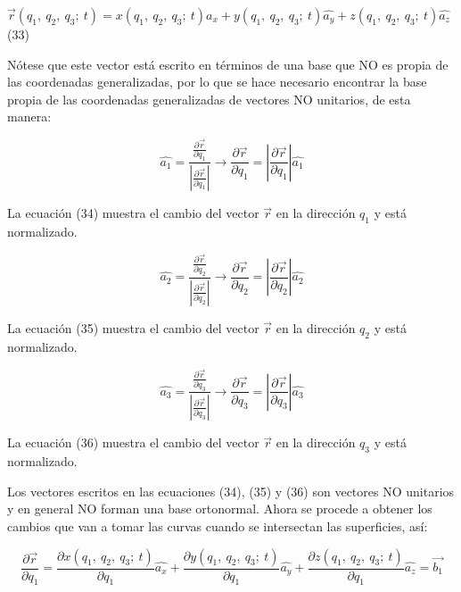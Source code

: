 \documentclass[]{article}
\begin{document}
\(\overrightarrow{r}\left( q_{1},\ q_{2},\ q_{3};\ t \right) = x\left( q_{1},\ q_{2},\ q_{3};\ t \right)\widehat{a_{x}} + y\left( q_{1},\ q_{2},\ q_{3};\ t \right)\widehat{a_{y}} + z\left( q_{1},\ q_{2},\ q_{3};\ t \right)\widehat{a_{z}}\)
(33)

Nótese que este vector está escrito en términos de una base que NO es
propia de las coordenadas generalizadas, por lo que se hace necesario
encontrar la base propia de las coordenadas generalizadas de vectores NO
unitarios, de esta manera:

\[\widehat{a_{1}} = \frac{\frac{\partial\overrightarrow{r}}{\partial q_{1}}}{\left| \frac{\partial\overrightarrow{r}}{\partial q_{1}} \right|} \rightarrow \frac{\partial\overrightarrow{r}}{\partial q_{1}} = \left| \frac{\partial\overrightarrow{r}}{\partial q_{1}} \right|\widehat{a_{1}}\]

La ecuación (34) muestra el cambio del vector \(\overrightarrow{r}\) en
la dirección \(q_{1}\) y está normalizado.

\[\widehat{a_{2}} = \frac{\frac{\partial\overrightarrow{r}}{\partial q_{2}}}{\left| \frac{\partial\overrightarrow{r}}{\partial q_{2}} \right|} \rightarrow \frac{\partial\overrightarrow{r}}{\partial q_{2}} = \left| \frac{\partial\overrightarrow{r}}{\partial q_{2}} \right|\widehat{a_{2}}\]

La ecuación (35) muestra el cambio del vector \(\overrightarrow{r}\) en
la dirección \(q_{2}\) y está normalizado.

\[\widehat{a_{3}} = \frac{\frac{\partial\overrightarrow{r}}{\partial q_{3}}}{\left| \frac{\partial\overrightarrow{r}}{\partial q_{3}} \right|} \rightarrow \frac{\partial\overrightarrow{r}}{\partial q_{3}} = \left| \frac{\partial\overrightarrow{r}}{\partial q_{3}} \right|\widehat{a_{3}}\]

La ecuación (36) muestra el cambio del vector \(\overrightarrow{r}\) en
la dirección \(q_{3}\) y está normalizado.

Los vectores escritos en las ecuaciones (34), (35) y (36) son vectores
NO unitarios y en general NO forman una base ortonormal. Ahora se
procede a obtener los cambios que van a tomar las curvas cuando se
intersectan las superficies, así:

\[\frac{\partial\overrightarrow{r}}{\partial q_{1}} = \frac{\partial x\left( q_{1},\ q_{2},\ q_{3};\ t \right)}{\partial q_{1}}\widehat{a_{x}} + \frac{\partial y\left( q_{1},\ q_{2},\ q_{3};\ t \right)}{\partial q_{1}}\widehat{a_{y}} + \frac{\partial z\left( q_{1},\ q_{2},\ q_{3};\ t \right)}{\partial q_{1}}\widehat{a_{z}} = \overrightarrow{b_{1}}\]
\end{document}
